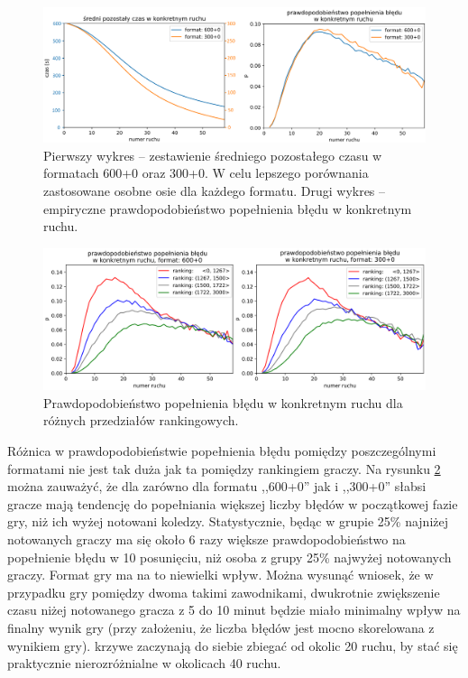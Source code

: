 \documentclass[inzynierska]{pwr_wmat_praca_dyplomowa}
\theoremstyle{plain}
\numberwithin{theorem}{chapter}
\theoremstyle{definition}
\numberwithin{theorem}{chapter}
\begin{document}
\begin{figure}[h]
	\centering
	\includegraphics[width=\textwidth]{pozostaly_czas.png}
	\caption{
		Pierwszy wykres -- zestawienie średniego pozostałego czasu w formatach 600+0 oraz 300+0. W celu lepszego porównania zastosowane osobne osie dla każdego formatu. Drugi wykres -- empiryczne prawdopodobieństwo popełnienia błędu w konkretnym ruchu.}
	\label{rys:pozostaly_czas}
\end{figure}
\begin{figure}[h]
	\centering
	\includegraphics[width=\textwidth]{prawd_blad_ELO.png}
	\caption{Prawdopodobieństwo popełnienia błędu w konkretnym ruchu dla różnych przedziałów rankingowych.}
	\label{rys:prawd_blad_ELO}
\end{figure}
Różnica w prawdopodobieństwie popełnienia błędu pomiędzy poszczególnymi formatami nie jest tak duża jak ta pomiędzy rankingiem graczy. Na rysunku \ref{rys:prawd_blad_ELO} można zauważyć, że dla zarówno dla formatu ,,600+0'' jak i ,,300+0'' słabsi gracze mają tendencję do popełniania większej liczby błędów w początkowej fazie gry, niż ich wyżej notowani koledzy. Statystycznie, będąc w grupie 25\% najniżej notowanych graczy ma się około 6 razy większe prawdopodobieństwo na popełnienie błędu w 10 posunięciu, niż osoba z grupy 25\% najwyżej notowanych graczy. Format gry ma na to niewielki wpływ. Można wysunąć wniosek, że w przypadku gry pomiędzy dwoma takimi zawodnikami, dwukrotnie zwiększenie czasu niżej notowanego gracza z 5 do 10 minut będzie miało minimalny wpływ na finalny wynik gry (przy założeniu, że liczba błędów jest mocno skorelowana z wynikiem gry). krzywe zaczynają do siebie zbiegać od okolic 20 ruchu, by stać się praktycznie nierozróżnialne w okolicach 40 ruchu.
\end{document}
